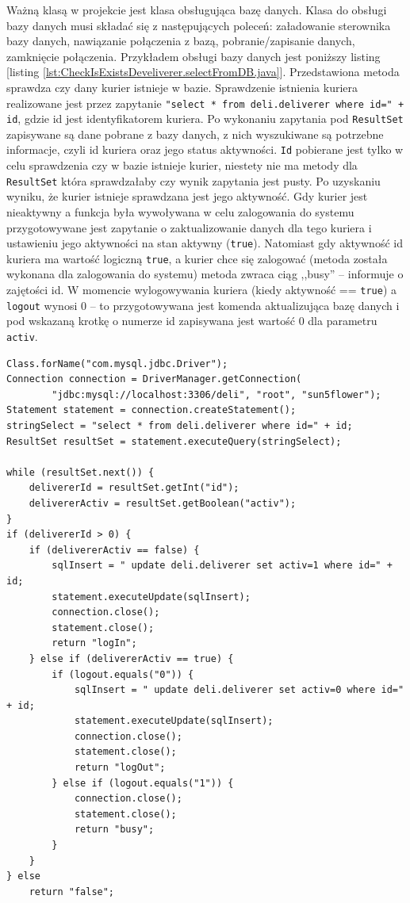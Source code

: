 \documentclass[eng,printmode,oneside]{mgr}
\begin{document}
Ważną klasą w projekcie jest klasa obsługująca bazę danych. Klasa do obsługi
bazy danych musi składać się z następujących poleceń: załadowanie sterownika
bazy danych, nawiązanie połączenia z bazą, pobranie/zapisanie danych, zamknięcie
połączenia. Przykładem obsługi bazy danych jest poniższy listing [listing
\ref{lst:CheckIsExistsDeveliverer.selectFromDB.java}]. Przedstawiona metoda
sprawdza czy dany kurier istnieje w bazie. Sprawdzenie istnienia
kuriera realizowane jest przez zapytanie \texttt{"select * from deli.deliverer where id=" + id}, gdzie id jest
identyfikatorem kuriera. Po wykonaniu zapytania pod \texttt{ResultSet}
zapisywane są dane pobrane z bazy danych, z nich wyszukiwane są potrzebne informacje, czyli
id kuriera oraz jego status aktywności. \texttt{Id} pobierane jest tylko w celu
sprawdzenia czy w bazie istnieje kurier, niestety nie ma metody dla
\texttt{ResultSet} która sprawdzałaby czy wynik zapytania jest pusty. Po
uzyskaniu wyniku, że kurier istnieje sprawdzana jest jego aktywność. Gdy kurier
jest nieaktywny a funkcja była wywoływana w celu zalogowania do systemu
przygotowywane jest zapytanie o zaktualizowanie danych dla tego kuriera i
ustawieniu jego aktywności na stan aktywny (\texttt{true}). Natomiast gdy
aktywność id kuriera ma wartość logiczną \texttt{true}, a kurier chce się
zalogować (metoda została wykonana dla zalogowania do systemu) metoda zwraca
ciąg ,,busy'' -- informuje o zajętości id.
W momencie wylogowywania kuriera (kiedy aktywność == \texttt{true}) a
\texttt{logout} wynosi 0 -- to przygotowywana jest komenda aktualizująca bazę
danych i pod wskazaną krotkę o numerze id zapisywana jest wartość 0 dla
parametru \texttt{activ}.

\begin{lstlisting}[caption=Połączenia z bazą danych na przykładzie metody
sprawdzającej istnienie kuriera oraz jego stan
używanej przez aplikację
mobilną,label=lst:CheckIsExistsDeveliverer.selectFromDB.java]
Class.forName("com.mysql.jdbc.Driver");
Connection connection = DriverManager.getConnection(
		"jdbc:mysql://localhost:3306/deli", "root", "sun5flower");
Statement statement = connection.createStatement();
stringSelect = "select * from deli.deliverer where id=" + id;
ResultSet resultSet = statement.executeQuery(stringSelect);

while (resultSet.next()) {
	delivererId = resultSet.getInt("id");
	delivererActiv = resultSet.getBoolean("activ");
} 
if (delivererId > 0) {
	if (delivererActiv == false) {
		sqlInsert = " update deli.deliverer set activ=1 where id=" + id;
		statement.executeUpdate(sqlInsert);
		connection.close();
		statement.close();
		return "logIn";
	} else if (delivererActiv == true) {
		if (logout.equals("0")) {
			sqlInsert = " update deli.deliverer set activ=0 where id=" + id;
			statement.executeUpdate(sqlInsert);
			connection.close();
			statement.close();
			return "logOut";
		} else if (logout.equals("1")) {
			connection.close();
			statement.close();
			return "busy";
		}
	}
} else
	return "false";
\end{lstlisting}
\end{document}
